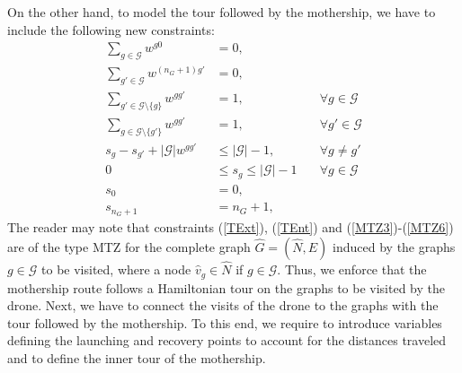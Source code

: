 \noindent
On the other hand, to model the tour followed by the mothership, we have to include the following new constraints:
\begin{align}
    \sum_{g\in\mathcal G} w^{g0} & = 0, \label{TOrig}\\
    \sum_{g'\in\mathcal G} w^{(n_G+1) g'} & = 0, \label{TDest}\\
    \sum_{g'\in\mathcal G\setminus\{g\}} w^{gg'} & = 1, \label{TExt} &\quad\forall g\in \mathcal G\\
    \sum_{g\in\mathcal G\setminus\{g'\}} w^{gg'} & = 1, &\quad\forall g'\in \mathcal G\label{TEnt}\\
    s_g - s_{g'} + |\mathcal G|w^{gg'} & \leq |\mathcal G| - 1  , &\quad\forall g \neq g' \tag{MTZ$_3$} \label{MTZ3}\\
    0 & \leq s_g \leq |\mathcal G| - 1 &\quad\forall g\in \mathcal G\tag{MTZ$_4$}\label{MTZ4}\\
    s_0 & = 0, \tag{MTZ$_5$}\label{MTZ5}\\
    s_{n_G+1}&=n_G+1, \tag{MTZ$_6$}\label{MTZ6}
\end{align}
\noindent
The reader may note that constraints (\ref{TExt}), (\ref{TEnt}) and (\ref{MTZ3})-(\ref{MTZ6}) are of the type MTZ for the complete graph $\hat G=(\hat N,\hat E)$ induced by the graphs $g\in \mathcal G$ to be visited, where a node $\hat v_g \in \hat N$ if $g\in \mathcal G$. Thus, we enforce that the mothership route follows a Hamiltonian tour on the graphs to be visited by the drone.  Next, we have to connect the visits of the drone to the graphs with the tour followed by the mothership. To this end, we require to introduce variables defining the launching and recovery points to account for the distances traveled and to define the inner tour of the mothership.\\

